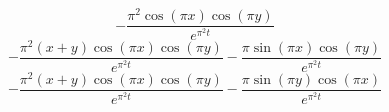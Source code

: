 \begin{equation}
 - \frac{\pi^{2} \operatorname{cos}\left(\pi x\right) \operatorname{cos}\left(\pi y\right)}{e^{\pi^{2} t}}
\end{equation}
\begin{equation}
- \frac{\pi^{2} \left(x + y\right) \operatorname{cos}\left(\pi x\right) \operatorname{cos}\left(\pi y\right)}{e^{\pi^{2} t}} - \frac{\pi \operatorname{sin}\left(\pi x\right) \operatorname{cos}\left(\pi y\right)}{e^{\pi^{2} t}}
\end{equation}
\begin{equation}
- \frac{\pi^{2} \left(x + y\right) \operatorname{cos}\left(\pi x\right) \operatorname{cos}\left(\pi y\right)}{e^{\pi^{2} t}} - \frac{\pi \operatorname{sin}\left(\pi y\right) \operatorname{cos}\left(\pi x\right)}{e^{\pi^{2} t}}
\end{equation}

